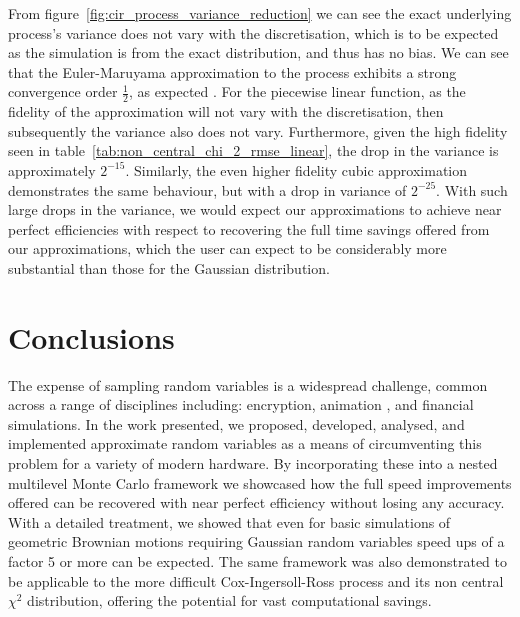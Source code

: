 \documentclass[manuscript,review]{acmart}
\begin{document}
From figure~\ref{fig:cir_process_variance_reduction} we can see the exact underlying process's variance does not vary with the discretisation, which is to be expected as the simulation is from the exact distribution, and thus has no bias. We can see that the Euler-Maruyama approximation to the process exhibits a strong convergence order $ \tfrac{1}{2} $, as expected \citep{higham2002strong,gyongy1998note}. For the piecewise linear function, as the fidelity of the approximation will not vary with the discretisation, then subsequently the variance also does not vary. Furthermore, given the high fidelity seen in table~\ref{tab:non_central_chi_2_rmse_linear}, the drop in the variance is approximately $ 2^{-15} $. Similarly, the even higher fidelity cubic approximation demonstrates the same behaviour, but with a drop in variance of $ 2^{-25} $. With such large drops in the variance, we would expect our approximations to achieve near perfect efficiencies with respect to recovering the full time savings offered from our approximations, which the user can expect to be considerably more substantial than those for the Gaussian distribution. 

\section{Conclusions}
\label{sec:conclusions}

The expense of sampling random variables is a widespread challenge, common across a range of disciplines including: encryption, animation \citep{lee2017vectorized}, and financial simulations. In the work presented, we proposed, developed, analysed, and implemented approximate random variables as a means of circumventing this problem for a variety of modern hardware. By incorporating these into a nested multilevel Monte Carlo framework we showcased how the full speed improvements offered can be recovered with near perfect efficiency without losing any accuracy. With a detailed treatment, we showed that even for basic simulations of geometric Brownian motions requiring Gaussian random variables speed ups of a factor 5 or more can be expected. The same framework was also demonstrated to be applicable to the more difficult Cox-Ingersoll-Ross process and its non central $ \chi^2 $ distribution, offering the potential for vast computational savings. 
\end{document}
